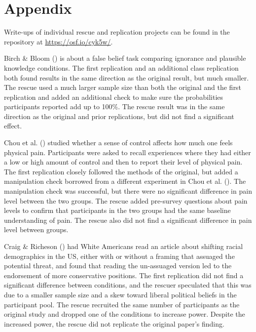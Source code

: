 \documentclass[
  english,
  a4paper,
]{article}
\begin{document}
\section*{Appendix}\label{appendix}

Write-ups of individual rescue and replication projects can be found in the repository at \url{https://osf.io/cyk5w/}.

Birch \& Bloom () is about a false belief task comparing ignorance and plausible knowledge conditions.
The first replication and an additional class replication both found results in the same direction as the original result, but much smaller.
The rescue used a much larger sample size than both the original and the first replication and added an additional check to make sure the probabilities participants reported add up to 100\%.
The rescue result was in the same direction as the original and prior replications, but did not find a significant effect.

Chou et al. () studied whether a sense of control affects how much one feels physical pain. Participants were asked to recall experiences where they had either a low or high amount of control and then to report their level of physical pain. The first replication closely followed the methods of the original, but added a manipulation check borrowed from a different experiment in Chou et al. (). The manipulation check was successful, but there were no significant difference in pain level between the two groups. The rescue added pre-survey questions about pain levels to confirm that participants in the two groups had the same baseline understanding of pain. The rescue also did not find a significant difference in pain level between groups.

Craig \& Richeson () had White Americans read an article about shifting racial demographics in the US, either with or without a framing that assuaged the potential threat, and found that reading the un-assuaged version led to the endorsement of more conservative positions.
The first replication did not find a significant difference between conditions, and the rescuer speculated that this was due to a smaller sample size and a skew toward liberal political beliefs in the participant pool.
The rescue recruited the same number of participants as the original study and dropped one of the conditions to increase power.
Despite the increased power, the rescue did not replicate the original paper's finding.
\end{document}
